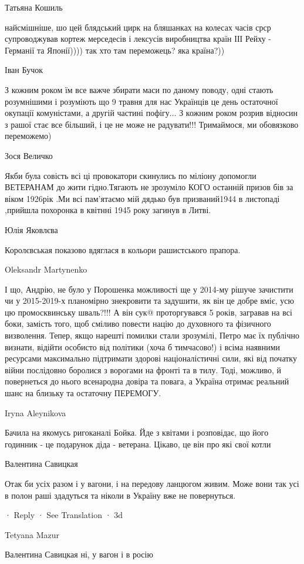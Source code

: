 Татьяна Кошиль

найсмішніше, шо цей блядський цирк на бляшанках на колесах часів срср
супроводжував кортеж мерседесів і лексусів виробництва країн ІІІ Рейху -
Германії та Японії)))) так хто там переможець? яка країна?))

Іван Бучок

З кожним роком їм все важче збирати маси по даному поводу, одні стають
розумнішими і розуміють що 9 травня для нас Українців це день остаточної
окупації комуністами, а другій частині пофігу... З кожним роком розрив відносин
з рашої стає все більший, і це не може не радувати!!! Тримаймося, ми обовязково
переможемо)

Зося Величко

Якби була совість всі ці провокатори скинулись по міліону допомогли ВЕТЕРАНАМ
до жити гідно.Тягають не зрозуміло КОГО останній призов бів за віком 1926рік
.Ми всі пам'ятаємо мій дядько був призваний1944 в листопаді ,прийшла похоронка
в квітнні 1945 року загинув в Литві.

Юлія Яковлєва

Королєвськая показово вдяглася в кольори рашистського прапора.

Oleksandr Martynenko

І що, Андрію, не було у Порошенка можливості ще у 2014-му рішуче зачистити чи у
2015-2019-х планомірно знекровити та задушити, як він це добре вміє, усю цю
промосквинську шваль?!!! А він сук@ проторгувався 5 років, загравав на всі
боки, замість того, щоб сміливо повести націю до духовного та фізичного
визволення. Тепер, якщо нарешті помилки стали зрозумілі, Петро має їх публічно
визнати, відійти особисто від політики (хоча б тимчасово!) і всіма наявними
ресурсами максимально підтримати здорові націоналістичні сили, які від початку
війни послідовно боролися з ворогами на фронті та в тилу. Тоді, можливо, й
повернеться до нього всенародна довіра та повага, а Україна отримає реальний
шанс на близьку та остаточну ПЕРЕМОГУ.

Iryna Aleynikova

Бачила на якомусь ригоканалі Бойка. Йде з квітами і розповідає, що його
годинник - це подарунок діда - ветерана. Цікаво, це він про які свої котли

Валентина Савицкая

Отак би усіх разом і у вагони, і на передову ланцюгом живим. Може вони так усі в полон раші здадуться та ніколи в Україну вже не повернуться.

 · Reply · See Translation · 3d

Tetyana Mazur

Валентина Савицкая ні, у вагон і в росію
